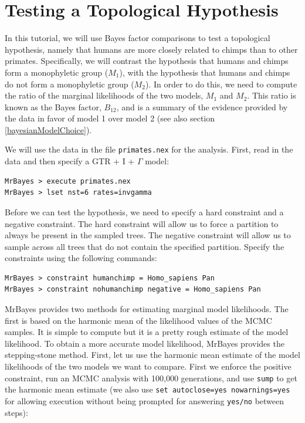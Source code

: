 \documentclass[12pt]{book}
\begin{document}
\section{Testing a Topological Hypothesis}

In this tutorial, we will use Bayes factor comparisons to test a topological hypothesis, namely
that humans are more closely related to chimps than to other primates. Specifically, we will
contrast the hypothesis that humans and chimps form a monophyletic group ($M_{1}$), with the
hypothesis that humans and chimps do not form a monophyletic group ($M_{2}$). In order to do this,
we need to compute the ratio of the marginal likelihoods of the two models, $M_{1}$ and $M_{2}$.
This ratio is known as the Bayes factor, $B_{12}$, and is a summary of the evidence provided by the
data in favor of model 1 over model 2 \citep{kass95} (see also section \ref{bayesianModelChoice}).

We will use the data in the file \texttt{primates.nex} for the analysis. First, read in the data 
and then specify a GTR + I + $\Gamma$ model: %

\begin{singlespacing}\small
\begin{verbatim}
MrBayes > execute primates.nex
MrBayes > lset nst=6 rates=invgamma
\end{verbatim}
\end{singlespacing}
\normalsize

Before we can test the hypothesis, we need to specify a hard constraint and a negative constraint.
The hard constraint will allow us to force a partition to always be present in the sampled trees.
The negative constraint will allow us to sample across all trees that do not contain the specified
partition. Specify the constraints using the following commands:

\begin{singlespacing}\small
\begin{verbatim}
MrBayes > constraint humanchimp = Homo_sapiens Pan
MrBayes > constraint nohumanchimp negative = Homo_sapiens Pan
\end{verbatim}
\end{singlespacing}
\normalsize

MrBayes provides two methods for estimating marginal model likelihoods. The first is based on the
harmonic mean of the likelihood values of the MCMC samples. It is simple to compute but it is a
pretty rough estimate of the model likelihood. To obtain a more accurate model likelihood, MrBayes
provides the stepping-stone method. First, let us use the harmonic mean estimate of the model
likelihoods of the two models we want to compare. First we enforce the positive constraint, run an
MCMC analysis with 100,000 generations, and use \texttt{sump} to get the harmonic mean estimate (we
also use \texttt{set autoclose=yes nowarnings=yes} for allowing execution without being prompted for
answering \texttt{yes/no} between steps):
\end{document}
